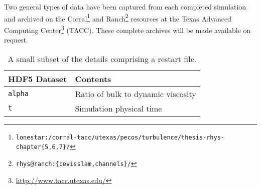 \label{sec:archiving}


Two general types of data have been captured from each completed
simulation and archived on the Corral\footnote{%
    \texttt{lonestar:/corral-tacc/utexas/pecos/turbulence/thesis-rhys-chapter\{5,6,7\}/}
}
and Ranch\footnote{%
    \texttt{rhys@ranch:\{cevisslam,channels\}/}
}
resources at the Texas Advanced Computing Center\footnote{%
    \url{http://www.tacc.utexas.edu/}
}
(TACC).  These complete archives will be made available on request. 

\begin{table}
\centering
\caption[Instantaneous fields and other details comprising a restart file]{%
  A small subset of the details comprising a restart file.}
\begin{small}
\begin{tabular}{p{}|p{}}
HDF5 Dataset & Contents \\ \hline \hline
\texttt{alpha                 } & Ratio of bulk to dynamic viscosity \\
\texttt{t                     } & Simulation physical time \\
\end{tabular}
\end{small}
\end{table}

